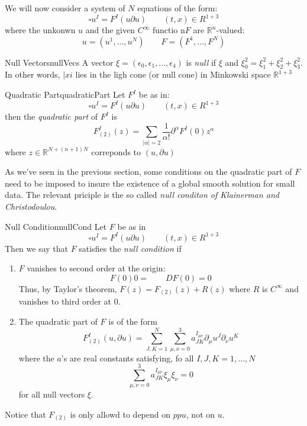 \documentclass{book}
\newcommand{\R}{{\mathbb{R}}}
\begin{document}
We will now consider a system of $N$ equations of the form:
\[
	\square u^I = F^I(u  \partial u) \qquad (t,x) \in R^{1+3}
\]
where the unkonwn $u$ and the given $C^\infty$ functio n$F$ are $\R^n$-valued:
\[
	u = (u^1, ..., u^N) \qquad F = (F^1, ..., F^N)
\]

\begin{defn}{Null Vectors}{nullVecs}
	A vector $\xi = (\epsilon_0, \epsilon_1, ..., \epsilon_4)$ is \emph{null} if $\xi$ and $\xi_0^2 = \xi_1^2
	+ \xi_2^2 + \xi_3^2$. In other words, $|xi$ lies in the ligh cone (or null cone) in Minkowski space $\R^{1 + 3}$
\end{defn}

\begin{defn}{Quadratic Part}{quadraticPart}
	Let $F^I$ be as in:
	\[
		\square u^I = F^I(u  \partial u) \qquad (t,x) \in R^{1+3}
	\]
	then the \emph{quadratic part} of $F^I$ is
	\[
		F_{(2)}^I(z) = \sum_{|\alpha| = 2} \frac{1}{\alpha!}  \partial^\alpha F^I(0) z^\alpha
	\]
	where $z \in \R^{N + (n+1)N}$ correponds to $(u,  \partial u)$
\end{defn}

As we've seen in the previous section, some conditions on the quadratic part of $F$ need to be imposed to insure the
existence of a global smooth solution for small data. The relevant priciple is the so called \emph{null conditon
of Klainerman and Christodoulou}.

\begin{defn}{Null Condition}{nullCond}
	Let $F$ be as in
	\[
		\square u^I = F^I(u  \partial u) \qquad (t,x) \in R^{1+3}
	\]
	Then we say that $F$ satisfies the \emph{null condition} if
	\begin{enumerate}
		\item $F$ vanishes to second order at the origin:
			\[
				F(0) 0 = \qquad DF(0) = 0
			\]
			Thus, by Taylor's theorem, $F(z) = F_{(2)}(z) + R(z)$ where $R$ is $C^\infty$ and vanishes
			to third order at $0$.
		\item The quadratic part of $F$ is of the form
			\[
				F_{(2)}^I(u,  \partial u) = \sum_{J,K=  1}^N \sum_{\mu, \nu = 0}^3 a_{JK}^{I_{\mu\nu}}
				 \partial_\mu u^J  \partial_\nu u^K
			 \]
			 where the $a$'s are real constants satisfying, fo all $I,J,K = 1,..., N$
			 \[
				 \sum_{\mu, \nu = 0}^3 a_{JK}^{I_{\mu\nu}}\xi_\mu \xi_\nu = 0
			 \]
			 for all null vectors $\xi$.
	\end{enumerate}
\end{defn}

Notice that $F_{(2)}$ is only allowd to depend on $pp u$, not on $u$.
\end{document}
